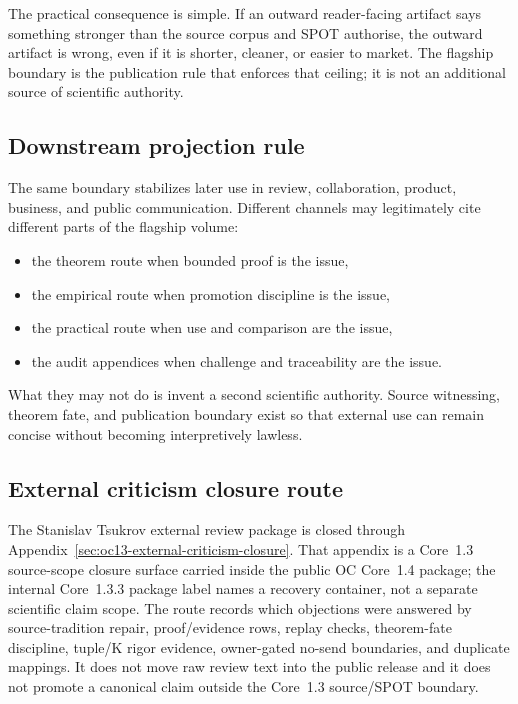 The practical consequence is simple. If an outward reader-facing artifact says
something stronger than the source corpus and SPOT authorise, the outward
artifact is wrong, even if it is shorter, cleaner, or easier to market. The
flagship boundary is the publication rule that enforces that ceiling; it is
not an additional source of scientific authority.

\subsection{Downstream projection rule}

The same boundary stabilizes later use in review, collaboration, product,
business, and public communication. Different channels may legitimately cite
different parts of the flagship volume:

\begin{itemize}
\item the theorem route when bounded proof is the issue,
\item the empirical route when promotion discipline is the issue,
\item the practical route when use and comparison are the issue,
\item the audit appendices when challenge and traceability are the issue.
\end{itemize}

What they may not do is invent a second scientific authority. Source witnessing,
theorem fate, and publication boundary exist so that external use can remain
concise without becoming interpretively lawless.

\subsection{External criticism closure route}
\label{sec:oc13-source-audit-external-criticism-closure}

The Stanislav Tsukrov external review package is closed through Appendix~\ref{sec:oc13-external-criticism-closure}. That appendix is a Core~1.3 source-scope closure surface carried inside the public OC Core~1.4 package; the internal Core~1.3.3 package label names a recovery container, not a separate scientific claim scope. The route records which objections were answered by source-tradition repair, proof/evidence rows, replay checks, theorem-fate discipline, tuple/K rigor evidence, owner-gated no-send boundaries, and duplicate mappings. It does not move raw review text into the public release and it does not promote a canonical claim outside the Core~1.3 source/SPOT boundary.


